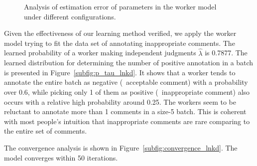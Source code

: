 \begin{figure}[!t]
  \centering
  \caption{\label{fig:esterr}
  Analysis of estimation error of parameters in the worker model under different configurations. 
  }
\end{figure}



Given the effectiveness of our learning method verified, 
we apply the worker model trying to fit the data set of annotating inappropriate comments.  
The learned probability of a worker making independent judgments $\hat{\lambda}$ is 0.7877.  
The learned distribution for determining the number of positive annotation in a batch is presented in Figure~\ref{subfig:p_tau_lnkd}.  
It shows that a worker tends to annotate the entire batch as negative (\ie~acceptable comment) with a probability over 0.6, 
while picking only 1 of them as positive (\ie~inappropriate comment) also occurs with a relative high probability around 0.25.  
The workers seem to be reluctant to annotate more than 1 comments in a size-5 batch.  
This is coherent with most people's intuition that inappropriate comments are rare comparing to the entire set of comments.  

The convergence analysis is shown in Figure~\ref{subfig:convergence_lnkd}.  
The model converges within 50 iterations.  


